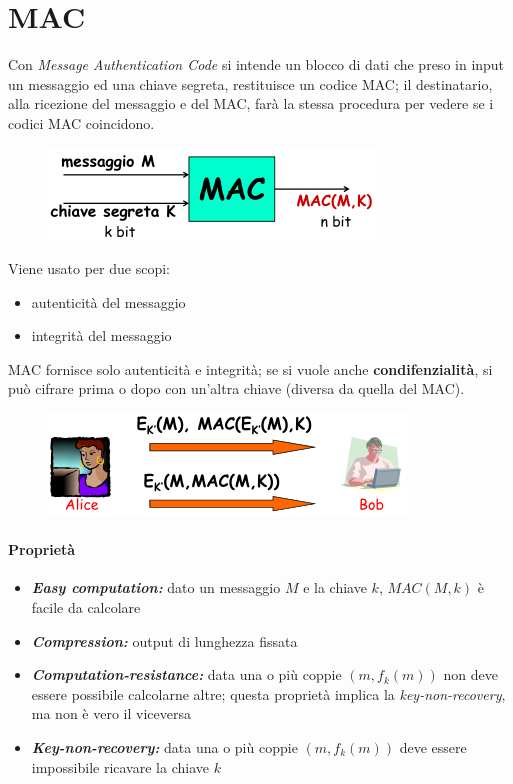 \chapter{MAC}

Con \textit{Message Authentication Code} si intende un blocco di dati che preso in input 
un messaggio ed una chiave segreta, restituisce un codice MAC; il destinatario, alla ricezione del 
messaggio e del MAC, farà la stessa procedura per vedere se i codici MAC coincidono.

\begin{figure}[H]
    \centering
    \includegraphics[width=0.7\linewidth]{chapters/chap06/images/mac.png}
\end{figure}

\noindent Viene usato per due scopi:
\begin{itemize}
    \item autenticità del messaggio 
    \item integrità del messaggio
\end{itemize}

\noindent MAC fornisce solo autenticità e integrità; se si vuole anche \textbf{condifenzialità},
si può cifrare prima o dopo con un'altra chiave (diversa da quella del MAC).

\begin{figure}[H]
    \centering
    \includegraphics[width=0.8\linewidth]{chapters/chap06/images/conf.png}
\end{figure}

\newpage
\subsubsection{Proprietà}

\begin{itemize}
    \item \textbf{\textit{Easy computation:}} dato un messaggio $M$ e la chiave $k$, $MAC(M,k)$ è facile da calcolare 
    \item \textbf{\textit{Compression:}} output di lunghezza fissata
    \item \textbf{\textit{Computation-resistance:}} data una o più coppie $(m, f_k(m))$ non deve 
    essere possibile calcolarne altre; questa proprietà implica la \textit{key-non-recovery}, ma non 
    è vero il viceversa
    \item \textbf{\textit{Key-non-recovery:}} data una o più coppie $(m, f_k(m))$ deve essere impossibile ricavare 
    la chiave $k$
\end{itemize}

